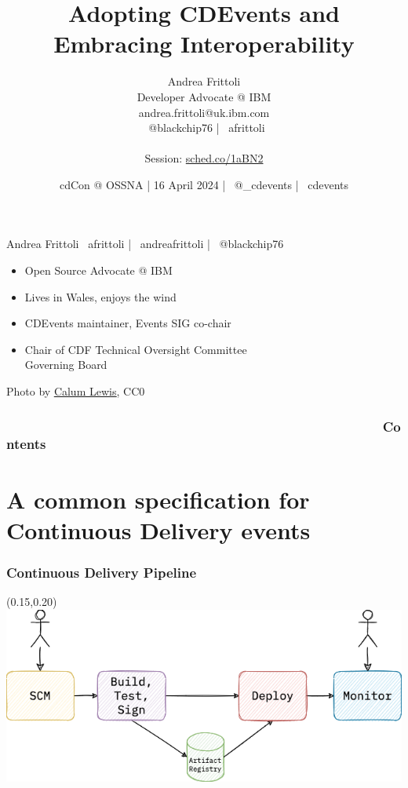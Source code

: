 \documentclass[aspectratio=169,11pt,hyperref={colorlinks=true}]{beamer}
\title{Adopting CDEvents and Embracing Interoperability}
\date[16 April 2024]{cdCon @ OSSNA | 16 April 2024 | \faTwitter ~@\_cdevents | \faGithub ~cdevents}
\author[Andrea Frittoli]{%
  Andrea Frittoli \\
  Developer Advocate @ IBM\\
  andrea.frittoli@uk.ibm.com \\
  \faTwitter ~@blackchip76 | \faGithub ~afrittoli\\
  ~\\
  Session: \href{https://sched.co/1aBN2}{sched.co/1aBN2}
}
\begin{document}
\begin{frame}
\titlepage{}
\end{frame}

\begin{speakerframe}{Andrea Frittoli}%
  {%
  \faGithub ~afrittoli | \faLinkedin ~andreafrittoli | \faTwitter ~@blackchip76
  }%
  {%
  \begin{itemize}
    \item{Open Source Advocate @ IBM}
    \item{Lives in Wales, enjoys the wind}
    \item{CDEvents maintainer, Events SIG co-chair}
    \item{Chair of CDF Technical Oversight Committee \\ Governing Board}
  \end{itemize}
  }%
\end{speakerframe}

\begin{lpicrblack}{%
  Photo by \href{https://unsplash.com/@calumlewis}{\underline{Calum Lewis}}, CC0
  }%
  {%
  \tableofcontents
  }%
  {}
  \frametitle{~~~~~~~~~~~~~~~~~~~~~~~~~~~~~~~~~~~~~~~~~~~~~~~~~~~Contents}
\end{lpicrblack}

\section[CDEvents]{A common specification for Continuous Delivery events}

\begin{grayframe}
  \frametitle{Continuous Delivery Pipeline}
  \begin{textblock*}{0.70\paperwidth}(0.15\paperwidth,0.20\paperheight)
    \includegraphics[width=0.70\paperwidth]{img/cdevents-1-no-events.png}
  \end{textblock*}
\end{grayframe}
\end{document}
